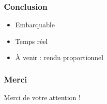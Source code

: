 \documentclass[12pt]{beamer}
\begin{document}
    \begin{frame}
    \frametitle{Conclusion}
    
    
    \Large
    \begin{itemize}
      \item Embarquable
      \item Temps réel
      \item \`A venir : rendu proportionnel
    \end{itemize}
    
    \end{frame}

    \begin{frame}
    \frametitle{Merci}

    \Huge
    \begin{center}
    Merci de votre attention !
    
    \end{center}
    \end{frame}
    
    
\end{document}
